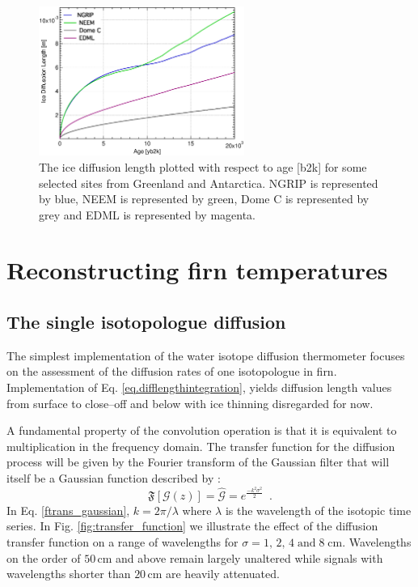 \documentclass[11pt, draftcls, onecolumn]{IEEEtran} %
\numberwithin{equation}{section}
\numberwithin{table}{section}
\numberwithin{figure}{section}
\begin{document}
\begin{figure}[]
	\vspace*{2mm}
	\begin{center}
		\includegraphics[width=0.6\textwidth]{./Figure_2}
		\caption{The ice diffusion length plotted with respect to age [b2k]
			for some selected sites from Greenland and Antarctica.
			NGRIP is represented by blue, NEEM is represented by green, 
			Dome C is represented by grey and EDML is represented by magenta.} 
		\label{fig:ice_diffusion_multi}
	\end{center}
\end{figure}

\section{Reconstructing firn temperatures}  \label{sec:methods}
\subsection{The single isotopologue diffusion}\label{sec:single_diffusion}

The simplest implementation of the water isotope diffusion thermometer focuses on the
assessment of the diffusion rates of one isotopologue in firn.
Implementation of Eq. \ref{eq.difflengthintegration}, yields diffusion length values 
from surface to close--off and below with ice thinning disregarded for now. 


A fundamental property of the convolution operation is that it is equivalent to  multiplication
 in the frequency domain. The transfer function for the diffusion process will be given by the
Fourier transform of the Gaussian filter that will itself be a Gaussian function described by 
\citep{Abramowitz1964, Gkinis2014}:
\begin{equation}
\label{ftrans_gaussian}
\mathfrak{F}
[ \mathcal{G} (z) ] =
\hat{\mathcal{G}} = {e}^{\frac{-k^2 \sigma^2}{2}} {} \enspace .
\end{equation}%
In Eq. \ref{ftrans_gaussian}, $k = 2\pi / \lambda$ where $\lambda$ is the wavelength of the 
isotopic time series. 
In Fig. \ref{fig:transfer_function} we illustrate the effect of the diffusion transfer function on a range of wavelengths
for $\sigma = 1,\, 2,\, 4\; \mathrm{and} \;8 \;	\mathrm{cm.}$ 
Wavelengths on the order of $50\,\mathrm{cm}$ and above remain largely unaltered while signals with 
wavelengths shorter than $20\,\mathrm{cm}$ are heavily attenuated. 
\end{document}
